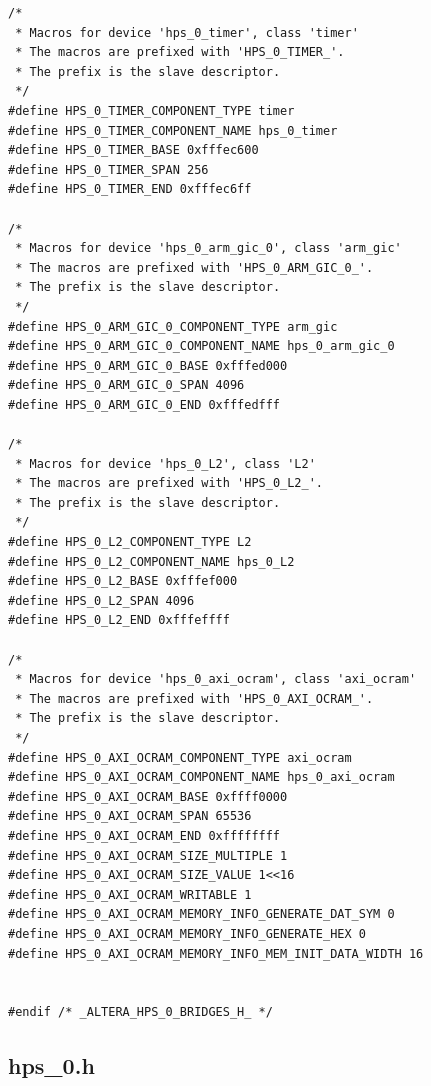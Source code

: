\documentclass[conference]{IEEEtran}
\begin{document}
\begin{lstlisting}
/*
 * Macros for device 'hps_0_timer', class 'timer'
 * The macros are prefixed with 'HPS_0_TIMER_'.
 * The prefix is the slave descriptor.
 */
#define HPS_0_TIMER_COMPONENT_TYPE timer
#define HPS_0_TIMER_COMPONENT_NAME hps_0_timer
#define HPS_0_TIMER_BASE 0xfffec600
#define HPS_0_TIMER_SPAN 256
#define HPS_0_TIMER_END 0xfffec6ff

/*
 * Macros for device 'hps_0_arm_gic_0', class 'arm_gic'
 * The macros are prefixed with 'HPS_0_ARM_GIC_0_'.
 * The prefix is the slave descriptor.
 */
#define HPS_0_ARM_GIC_0_COMPONENT_TYPE arm_gic
#define HPS_0_ARM_GIC_0_COMPONENT_NAME hps_0_arm_gic_0
#define HPS_0_ARM_GIC_0_BASE 0xfffed000
#define HPS_0_ARM_GIC_0_SPAN 4096
#define HPS_0_ARM_GIC_0_END 0xfffedfff

/*
 * Macros for device 'hps_0_L2', class 'L2'
 * The macros are prefixed with 'HPS_0_L2_'.
 * The prefix is the slave descriptor.
 */
#define HPS_0_L2_COMPONENT_TYPE L2
#define HPS_0_L2_COMPONENT_NAME hps_0_L2
#define HPS_0_L2_BASE 0xfffef000
#define HPS_0_L2_SPAN 4096
#define HPS_0_L2_END 0xfffeffff

/*
 * Macros for device 'hps_0_axi_ocram', class 'axi_ocram'
 * The macros are prefixed with 'HPS_0_AXI_OCRAM_'.
 * The prefix is the slave descriptor.
 */
#define HPS_0_AXI_OCRAM_COMPONENT_TYPE axi_ocram
#define HPS_0_AXI_OCRAM_COMPONENT_NAME hps_0_axi_ocram
#define HPS_0_AXI_OCRAM_BASE 0xffff0000
#define HPS_0_AXI_OCRAM_SPAN 65536
#define HPS_0_AXI_OCRAM_END 0xffffffff
#define HPS_0_AXI_OCRAM_SIZE_MULTIPLE 1
#define HPS_0_AXI_OCRAM_SIZE_VALUE 1<<16
#define HPS_0_AXI_OCRAM_WRITABLE 1
#define HPS_0_AXI_OCRAM_MEMORY_INFO_GENERATE_DAT_SYM 0
#define HPS_0_AXI_OCRAM_MEMORY_INFO_GENERATE_HEX 0
#define HPS_0_AXI_OCRAM_MEMORY_INFO_MEM_INIT_DATA_WIDTH 16


#endif /* _ALTERA_HPS_0_BRIDGES_H_ */

\end{lstlisting}

\subsection{hps\_0.h}
\end{document}
